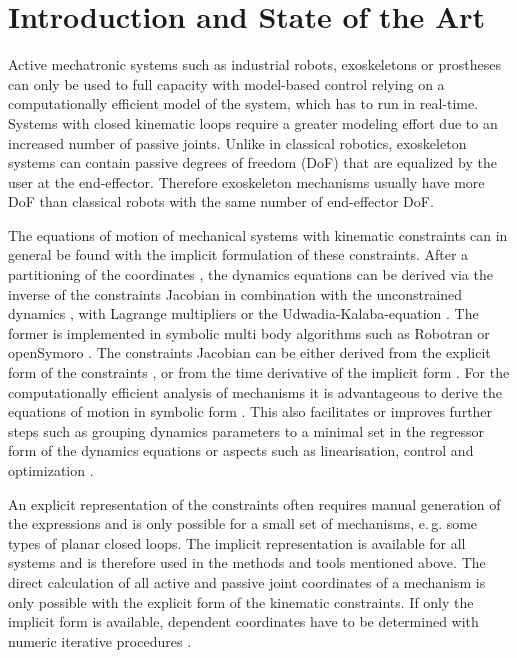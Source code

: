 \documentclass{svproc}
\begin{document}
\section{Introduction and State of the Art}

Active mechatronic systems such as industrial robots, exoskeletons or prostheses can only be used to full capacity with model-based control relying on a computationally efficient model of the system, which has to run in real-time.
Systems with closed kinematic loops require a greater modeling effort due to an increased number of passive joints.
Unlike in classical robotics, exoskeleton systems can contain passive degrees of freedom (DoF) that are equalized by the user at the end-effector.
Therefore exoskeleton mechanisms usually have more DoF than classical robots with the same number of end-effector DoF.

The equations of motion of mechanical systems with kinematic constraints can in general be found with the implicit formulation of these constraints.
After a partitioning of the coordinates \cite{WehageHau1982}, the dynamics equations can be derived via the inverse of the constraints Jacobian in combination with the unconstrained dynamics \cite{NakamuraGho1989}, with Lagrange multipliers \cite{WehageHau1982,LuhZhe1985} or the Udwadia-Kalaba-equation \cite{UdwadiaKal1992}.
The former is implemented in symbolic multi body algorithms such as Robotran \cite{SaminFis2013} or openSymoro \cite{KhalilVijKhoMuk2014}.
The constraints Jacobian can be either derived from the explicit form of the constraints \cite{NakamuraGho1989}, or from the time derivative of the implicit form \cite{ParkChoPlo1999}.
%
For the computationally efficient analysis of mechanisms it is advantageous to derive the equations of motion in symbolic form \cite{SaminFis2013}.
This also facilitates or improves further steps such as grouping dynamics parameters to a minimal set  in the regressor form of the dynamics equations \cite{KhalilBen1995} or aspects such as linearisation, control and optimization \cite{ParkChoPlo1999}.

An explicit representation of the constraints often requires manual generation of the expressions and is only possible for a small set of mechanisms, e.\,g. some types of planar closed loops.
The implicit representation is available for all systems and is therefore used in the methods and tools mentioned above.
%
The direct calculation of all active and passive joint coordinates of a mechanism is only possible with the explicit form of the kinematic constraints.
If only the implicit form is available, dependent coordinates have to be determined with numeric iterative procedures \cite{ParkChoPlo1999}.
\end{document}
